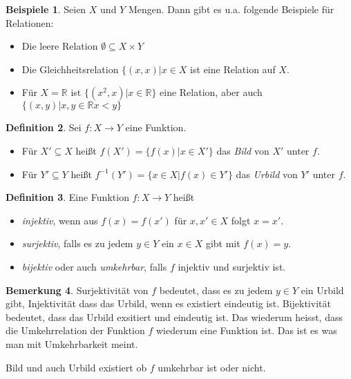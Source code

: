 \documentclass[index=totoc]{scrartcl}%
\theoremstyle{definition}
\newtheorem{defi}{Definition}[section]
\newtheorem{bem}[defi]{Bemerkung}
\newtheorem{bspe}[defi]{Beispiele}
\newcommand{\R}{\mathbb R}
\begin{document}
\begin{bspe}
  Seien $X$ und $Y$ Mengen.
  Dann gibt es u.a. folgende Beispiele für Relationen:
  \begin{itemize}
  \item
    Die leere Relation $\emptyset\subseteq X\times Y$ 
  \item
    Die Gleichheitsrelation $\{(x,x)|x\in X$ ist eine Relation auf $X$.
  \item
    Für $X=\R$ ist $\{(x^2,x)|x\in\R\}$ eine Relation,
    aber auch $\{(x,y)|x,y\in\R x<y\}$
  \end{itemize}
\end{bspe}


\begin{defi}
  Sei $f\colon X\to Y$ eine Funktion.
  \begin{itemize}
  \item
    Für $X'\subseteq X$ heißt $f(X')=\{f(x)|x\in X'\}$
    das {\em Bild} von $X'$ unter $f$.
  \item
    Für $Y'\subseteq Y$ heißt $f^{-1}(Y')=\{x\in X|f(x)\in Y'\}$
    das {\em Urbild} von $Y'$ unter $f$.
  \end{itemize}
\end{defi}

\begin{defi}
  Eine Funktion $f\colon X\to Y$ heißt
  \begin{itemize}
  \item
    {\em injektiv}, wenn aus $f(x)=f(x')$ für $x,x'\in X$ folgt $x=x'$.
  \item
    {\em surjektiv}, falls es zu jedem $y\in Y$ ein $x\in X$ gibt mit $f(x)=y$. 
  \item
    {\em bijektiv} oder auch {\em umkehrbar},
    falls $f$ injektiv und surjektiv ist. 
  \end{itemize}
\end{defi}

\begin{bem}
  Surjektivität von $f$ bedeutet, dass es zu jedem $y\in Y$ ein Urbild gibt,
  Injektivität dass das Urbild, wenn es existiert eindeutig ist.
  Bijektivität bedeutet, dass das Urbild exsitiert und eindeutig ist.
  Das wiederum heisst, dass die Umkehrrelation der Funktion $f$
  wiederum eine Funktion ist.
  Das ist es was man mit Umkehrbarkeit meint. 

  Bild und auch Urbild existiert ob $f$ umkehrbar ist oder nicht. 
\end{bem}
\end{document}
